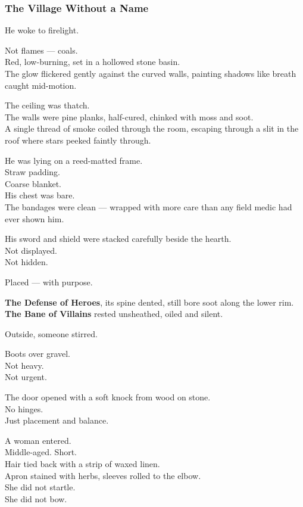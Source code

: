 \documentclass[12pt]{article}
\begin{document}
\subsubsection*{The Village Without a Name}

He woke to firelight.

Not flames — coals.\\
Red, low-burning, set in a hollowed stone basin.\\
The glow flickered gently against the curved walls, painting shadows like breath caught mid-motion.

The ceiling was thatch.\\
The walls were pine planks, half-cured, chinked with moss and soot.\\
A single thread of smoke coiled through the room, escaping through a slit in the roof where stars peeked faintly through.

He was lying on a reed-matted frame.\\
Straw padding.\\
Coarse blanket.\\
His chest was bare.\\
The bandages were clean — wrapped with more care than any field medic had ever shown him.

\vspace{1em}

His sword and shield were stacked carefully beside the hearth.\\
Not displayed.\\
Not hidden.

Placed — with purpose.

\textbf{The Defense of Heroes}, its spine dented, still bore soot along the lower rim.\\
\textbf{The Bane of Villains} rested unsheathed, oiled and silent.

\vspace{1em}

Outside, someone stirred.

Boots over gravel.\\
Not heavy.\\
Not urgent.

The door opened with a soft knock from wood on stone.\\
No hinges.\\
Just placement and balance.

A woman entered.\\
Middle-aged. Short.\\
Hair tied back with a strip of waxed linen.\\
Apron stained with herbs, sleeves rolled to the elbow.\\
She did not startle.\\
She did not bow.
\end{document}
